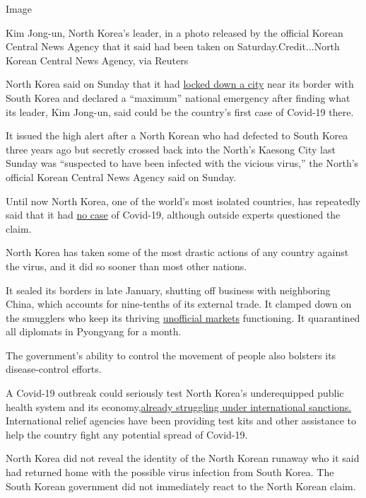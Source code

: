 Image

Kim Jong-un, North Korea's leader, in a photo released by the official
Korean Central News Agency that it said had been taken on
Saturday.Credit...North Korean Central News Agency, via Reuters

North Korea said on Sunday that it had
\href{https://www.nytimes3xbfgragh.onion/2020/07/25/world/asia/north-korea-coronavirus-kim-jong-un.html}{locked
down a city} near its border with South Korea and declared a ``maximum''
national emergency after finding what its leader, Kim Jong-un, said
could be the country's first case of Covid-19 there.

It issued the high alert after a North Korean who had defected to South
Korea three years ago but secretly crossed back into the North's Kaesong
City last Sunday was ``suspected to have been infected with the vicious
virus,'' the North's official Korean Central News Agency said on Sunday.

Until now North Korea, one of the world's most isolated countries, has
repeatedly said that it had
\href{https://www.nytimes3xbfgragh.onion/2020/03/31/world/asia/north-korea-coronavirus.html}{no
case} of Covid-19, although outside experts questioned the claim.

North Korea has taken some of the most drastic actions of any country
against the virus, and it did so sooner than most other nations.

It sealed its borders in late January, shutting off business with
neighboring China, which accounts for nine-tenths of its external trade.
It clamped down on the smugglers who keep its thriving
\href{https://www.nytimes3xbfgragh.onion/2017/04/30/world/asia/north-korea-economy-marketplace.html}{unofficial
markets} functioning. It quarantined all diplomats in Pyongyang for a
month.

​The government's ability to control the movement of people​ also
bolsters its disease-control efforts.

A Covid-19 outbreak could seriously test North Korea's underequipped
public health system and its
economy,\href{https://www.nytimes3xbfgragh.onion/2020/07/04/world/asia/north-korea-sanctions-coronavirus.html}{already
struggling under international sanctions.} International relief agencies
have been providing test kits and other assistance to help the country
fight any potential spread of Covid-19.

North Korea did not reveal the identity of the North Korean runaway who
it said had returned home with the possible virus infection from South
Korea. The South Korean government did not immediately react to the
North Korean claim.


